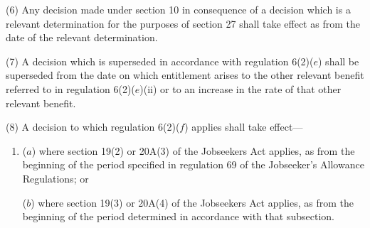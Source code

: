 \documentclass[12pt,a4paper]{article}
\begin{document}
(6) Any decision made under section 10 in consequence of a decision which is a relevant determination for the purposes of section 27 shall take effect as from the date of the relevant determination.



(7) A decision which is superseded in accordance with regulation 6(2)($e$)  shall be superseded from the date on which entitlement arises to the other relevant benefit referred to in regulation 6(2)($e$)(ii) or to an increase in the rate of that other relevant benefit.

%

(8) A decision to which regulation 6(2)($f$)  applies shall take effect—
\begin{enumerate}\item[]
($a$) where section 19(2) 
or 20A(3)  %
of the Jobseekers Act applies, as from the beginning of the period specified in regulation 69 of the Jobseeker’s Allowance Regulations; or

($b$) where section 19(3) 
or 20A(4)  %
of the Jobseekers Act applies, as from the beginning of the period determined in accordance with that subsection.
\end{enumerate}
\end{document}

